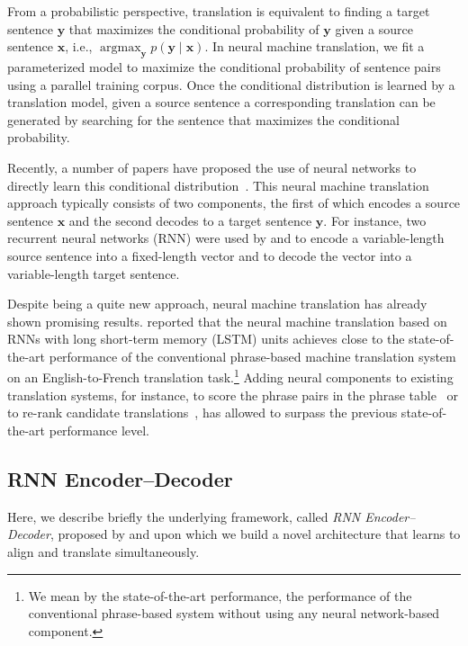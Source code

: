\documentclass{article} %
\newcommand{\vect}[1]{\mathbf{#1}}
\newcommand{\vx}[0]{\vect{x}}
\newcommand{\vy}[0]{\vect{y}}
\DeclareMathOperator*{\argmax}{\arg \max}
\begin{document}
From a probabilistic perspective, translation is equivalent to finding a target
sentence $\vy$ that maximizes the conditional probability of $\vy$ given a
source sentence $\vx$, i.e., $\argmax_{\vy} p(\vy \mid \vx)$.  In neural
machine translation, we fit a parameterized model to maximize the conditional
probability of sentence pairs using a parallel training corpus. Once the
conditional distribution is learned by a translation model, given a source
sentence a corresponding translation can be generated by searching for the
sentence that maximizes the conditional probability.

Recently, a number of papers have proposed the use of neural networks to
directly learn this conditional distribution~\citep[see,
e.g.,][]{Kalchbrenner2013,Cho2014,Sutskever2014,Cho2014a,Forcada1997}. This
neural machine translation approach typically consists of two components, the
first of which encodes a source sentence $\vx$ and the second decodes to a
target sentence $\vy$. For instance, two recurrent neural networks (RNN) were
used by \citep{Cho2014} and \citep{Sutskever2014} to encode a variable-length
source sentence into a fixed-length vector and to decode the vector into a
variable-length target sentence.

Despite being a quite new approach, neural machine translation has already
shown promising results. \citet{Sutskever2014} reported that the neural machine
translation based on RNNs with long short-term memory (LSTM) units achieves
close to the state-of-the-art performance of the conventional phrase-based
machine translation system on an English-to-French translation task.\footnote{
    We mean by the state-of-the-art performance, the performance of the
    conventional phrase-based system without using any neural network-based
    component.
} 
Adding neural components to existing translation systems, for instance,
to score the phrase pairs in the phrase table~\citep{Cho2014} or to re-rank
candidate translations~\citep{Sutskever2014}, has allowed to
surpass the previous state-of-the-art performance level.

\subsection{RNN Encoder--Decoder}

Here, we describe briefly the underlying framework, called {\it RNN
Encoder--Decoder}, proposed by \citet{Cho2014} and \citet{Sutskever2014} upon
which we build a novel architecture that learns to align and translate
simultaneously.
\end{document}
